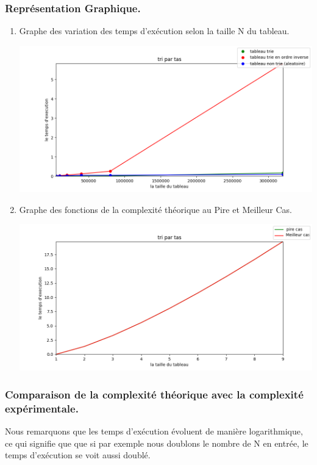 \documentclass[12pt]{article}
\begin{document}
\subsubsection{Représentation Graphique.}
\begin{enumerate}
	\item Graphe des variation des temps d'exécution selon la taille N du tableau.
	
	\includegraphics[width=1\textwidth]{graph/tri_tas.png}
	
	
	\item Graphe des fonctions de la complexité théorique au Pire et Meilleur Cas.
	
	\includegraphics[width=1\textwidth]{graph/tri_tas_teorique.png}
	
\end{enumerate}

\subsubsection{Comparaison de la complexité théorique avec la complexité expérimentale.}


 Nous remarquons que les temps d'exécution évoluent de manière logarithmique, \\
  ce qui signifie que que si par exemple nous doublons le nombre de N en entrée, le temps d'exécution se voit aussi doublé. \\
\end{document}

